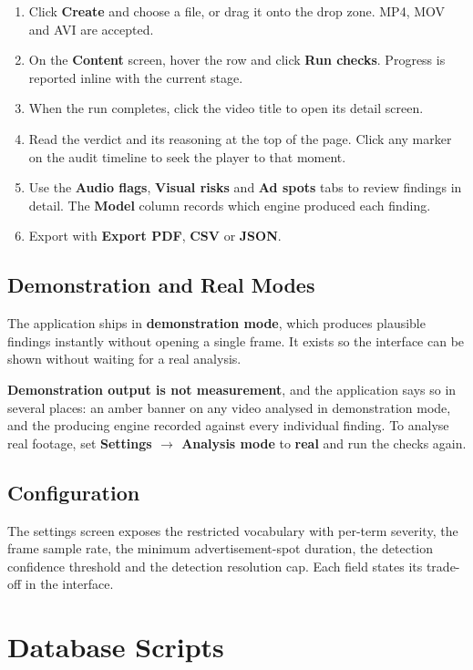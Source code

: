 \documentclass[
12pt,
a4paper,
oneside
]{report}
\begin{document}
\begin{enumerate}[itemsep=3pt]
\item Click \textbf{Create} and choose a file, or drag it onto the drop zone.
MP4, MOV and AVI are accepted.
\item On the \textbf{Content} screen, hover the row and click \textbf{Run
checks}. Progress is reported inline with the current stage.
\item When the run completes, click the video title to open its detail screen.
\item Read the verdict and its reasoning at the top of the page. Click any
marker on the audit timeline to seek the player to that moment.
\item Use the \textbf{Audio flags}, \textbf{Visual risks} and \textbf{Ad spots}
tabs to review findings in detail. The \textbf{Model} column records which
engine produced each finding.
\item Export with \textbf{Export PDF}, \textbf{CSV} or \textbf{JSON}.
\end{enumerate}

\section{Demonstration and Real Modes}

The application ships in \textbf{demonstration mode}, which produces plausible
findings instantly without opening a single frame. It exists so the interface
can be shown without waiting for a real analysis.

\textbf{Demonstration output is not measurement}, and the application says so in
several places: an amber banner on any video analysed in demonstration mode, and
the producing engine recorded against every individual finding. To analyse real
footage, set \textbf{Settings $\rightarrow$ Analysis mode} to \textbf{real} and
run the checks again.

\section{Configuration}

The settings screen exposes the restricted vocabulary with per-term severity,
the frame sample rate, the minimum advertisement-spot duration, the detection
confidence threshold and the detection resolution cap. Each field states its
trade-off in the interface.

\chapter{Database Scripts}
\end{document}
